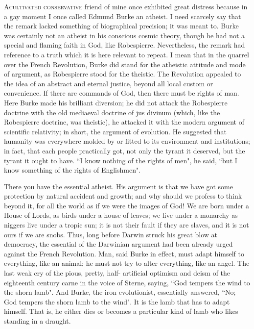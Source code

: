 \documentclass[final,10pt,letterpaper,twocolumn,openany]{book}
\newcommand{\dcap}[2]{
	 \lettrine[nindent=0em,findent=2pt,lines=3,loversize=.15,lraise=0]{#1}{#2}
 }
\begin{document}
     \dcap{A}{cultivated conservative} friend of mine once exhibited great distress
because in a gay moment I once called Edmund Burke an atheist. I need
scarcely say that the remark lacked something of biographical precision; it
was meant to. Burke was certainly not an atheist in his conscious cosmic
theory, though he had not a special and flaming faith in God, like
Robespierre. Nevertheless, the remark had reference to a truth which it is
here relevant to repeat. I mean that in the quarrel over the French
Revolution, Burke did stand for the atheistic attitude and mode of
argument, as Robespierre stood for the theistic. The Revolution appealed
to the idea of an abstract and eternal justice, beyond all local custom or
convenience. If there are commands of God, then there must be rights of
man. Here Burke made his brilliant diversion; he did not attack the
Robespierre doctrine with the old mediaeval doctrine of jus divinum
(which, like the Robespierre doctrine, was theistic), he attacked it with the
modern argument of scientific relativity; in short, the argument of
evolution. He suggested that humanity was everywhere molded by or
fitted to its environment and institutions; in fact, that each people
practically got, not only the tyrant it deserved, but the tyrant it ought to
have. ``I know nothing of the rights of men", he said, ``but I know
something of the rights of Englishmen". 

There you have the essential
atheist. His argument is that we have got some protection by natural
accident and growth; and why should we profess to think beyond it, for all
the world as if we were the images of God! We are born under a House of
Lords, as birds under a house of leaves; we live under a monarchy as
niggers live under a tropic sun; it is not their fault if they are slaves, and it
is not ours if we are snobs. Thus, long before Darwin struck his great blow
at democracy, the essential of the Darwinian argument had been already
urged against the French Revolution. Man, said Burke in effect, must
adapt himself to everything, like an animal; he must not try to alter
everything, like an angel. The last weak cry of the pious, pretty, half-
artificial optimism and deism of the eighteenth century carne in the voice
of Sterne, saying, ``God tempers the wind to the shorn lamb". And Burke,
the iron evolutionist, essentially answered, ``No; God tempers the shorn
lamb to the wind". It is the lamb that has to adapt himself. That is, he
either dies or becomes a particular kind of lamb who likes standing in a
draught.
\end{document}
